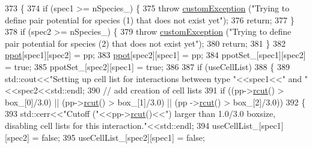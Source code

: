 \begin{DoxyCode}
373                                                                                                    \{
374                 \textcolor{keywordflow}{if} (spec1 >= nSpecies\_) \{
375                                 \textcolor{keywordflow}{throw} \hyperlink{classcustom_exception}{customException} (\textcolor{stringliteral}{"Trying to define pair potential for
       species (1) that does not exist yet"});
376                                 \textcolor{keywordflow}{return};
377                 \}
378                 \textcolor{keywordflow}{if} (spec2 >= nSpecies\_) \{
379                                 \textcolor{keywordflow}{throw} \hyperlink{classcustom_exception}{customException} (\textcolor{stringliteral}{"Trying to define pair potential for
       species (2) that does not exist yet"});
380                                 \textcolor{keywordflow}{return};
381                 \}
382                 \hyperlink{classsim_system_a8d6271751a62f61edcf57f773540a4a3}{ppot}[spec1][spec2] = pp;
383                 \hyperlink{classsim_system_a8d6271751a62f61edcf57f773540a4a3}{ppot}[spec2][spec1] = pp;
384                 ppotSet\_[spec1][spec2] = \textcolor{keyword}{true};
385                 ppotSet\_[spec2][spec1] = \textcolor{keyword}{true};
386                 
387                 \textcolor{keywordflow}{if} (useCellList)
388                 \{
389                                 std::cout<<\textcolor{stringliteral}{"Setting up cell list for interactions between type "}<<spec1<<\textcolor{stringliteral}{"
       and "}<<spec2<<std::endl;
390                                 \textcolor{comment}{// add creation of cell lists}
391                                 \textcolor{keywordflow}{if} ((pp->\hyperlink{classpair_potential_abf4f8d231c5e2e36d72916d33dcd75f0}{rcut}() > box\_[0]/3.0) || (pp->\hyperlink{classpair_potential_abf4f8d231c5e2e36d72916d33dcd75f0}{rcut}() > box\_[1]/3.0) || (pp
      ->\hyperlink{classpair_potential_abf4f8d231c5e2e36d72916d33dcd75f0}{rcut}() > box\_[2]/3.0))
392                                 \{
393                                                 std::cerr<<\textcolor{stringliteral}{"Cutoff ("}<<pp->\hyperlink{classpair_potential_abf4f8d231c5e2e36d72916d33dcd75f0}{rcut}()<<\textcolor{stringliteral}{") larger than
       1.0/3.0 boxsize, disabling cell lists for this interaction."}<<std::endl;
394                                                 useCellList\_[spec1][spec2] = \textcolor{keyword}{false};
395                                                 useCellList\_[spec2][spec1] = \textcolor{keyword}{false};

\end{DoxyCode}
